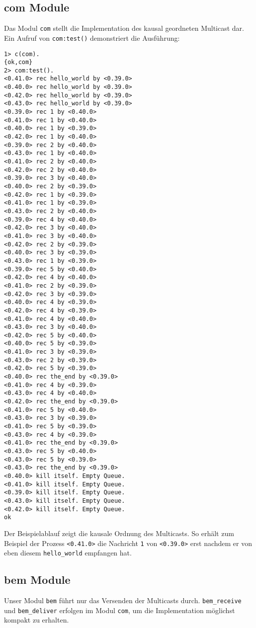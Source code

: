 \documentclass[a4paper,
12pt,
BCOR12mm,
]{scrartcl}
\theoremstyle{break}
\begin{document}
\subsection*{com Module}
Das Modul \verb|com| stellt die Implementation des kausal geordneten Multicast dar. Ein
Aufruf von \verb|com:test()| demonstriert die Ausführung:
{
\setlength{\columnseprule}{1pt}

\begin{multicols}{2}
\begin{verbatim}
1> c(com).
{ok,com}
2> com:test(). 
<0.41.0> rec hello_world by <0.39.0>
<0.40.0> rec hello_world by <0.39.0>
<0.42.0> rec hello_world by <0.39.0>
<0.43.0> rec hello_world by <0.39.0>
<0.39.0> rec 1 by <0.40.0>
<0.41.0> rec 1 by <0.40.0>
<0.40.0> rec 1 by <0.39.0>
<0.42.0> rec 1 by <0.40.0>
<0.39.0> rec 2 by <0.40.0>
<0.43.0> rec 1 by <0.40.0>
<0.41.0> rec 2 by <0.40.0>
<0.42.0> rec 2 by <0.40.0>
<0.39.0> rec 3 by <0.40.0>
<0.40.0> rec 2 by <0.39.0>
<0.42.0> rec 1 by <0.39.0>
<0.41.0> rec 1 by <0.39.0>
<0.43.0> rec 2 by <0.40.0>
<0.39.0> rec 4 by <0.40.0>
<0.42.0> rec 3 by <0.40.0>
<0.41.0> rec 3 by <0.40.0>
<0.42.0> rec 2 by <0.39.0>
<0.40.0> rec 3 by <0.39.0>
<0.43.0> rec 1 by <0.39.0>
<0.39.0> rec 5 by <0.40.0>
<0.42.0> rec 4 by <0.40.0>
<0.41.0> rec 2 by <0.39.0>
<0.42.0> rec 3 by <0.39.0>
<0.40.0> rec 4 by <0.39.0>
<0.42.0> rec 4 by <0.39.0>
<0.41.0> rec 4 by <0.40.0>
<0.43.0> rec 3 by <0.40.0>
<0.42.0> rec 5 by <0.40.0>
<0.40.0> rec 5 by <0.39.0>
<0.41.0> rec 3 by <0.39.0>
<0.43.0> rec 2 by <0.39.0>
<0.42.0> rec 5 by <0.39.0>
<0.40.0> rec the_end by <0.39.0>
<0.41.0> rec 4 by <0.39.0>
<0.43.0> rec 4 by <0.40.0>
<0.42.0> rec the_end by <0.39.0>
<0.41.0> rec 5 by <0.40.0>
<0.43.0> rec 3 by <0.39.0>
<0.41.0> rec 5 by <0.39.0>
<0.43.0> rec 4 by <0.39.0>
<0.41.0> rec the_end by <0.39.0>
<0.43.0> rec 5 by <0.40.0>
<0.43.0> rec 5 by <0.39.0>
<0.43.0> rec the_end by <0.39.0>
<0.40.0> kill itself. Empty Queue.
<0.41.0> kill itself. Empty Queue.
<0.39.0> kill itself. Empty Queue.
<0.43.0> kill itself. Empty Queue.
<0.42.0> kill itself. Empty Queue.
ok
\end{verbatim}
  \end{multicols}
}

Der Beispielablauf zeigt die kausale Ordnung des Multicasts. So erhält zum Beispiel der
Prozess \verb|<0.41.0>| die Nachricht \verb|1| von \verb|<0.39.0>| erst nachdem er von
eben diesem \verb|hello_world| empfangen hat.

  
\subsection*{bem Module}
Unser Modul \verb|bem| führt nur das Versenden der Multicasts durch. \verb|bem_receive|
und \verb|bem_deliver| erfolgen im Modul \verb|com|, um die Implementation möglichst
kompakt zu erhalten.
  
\end{document}
